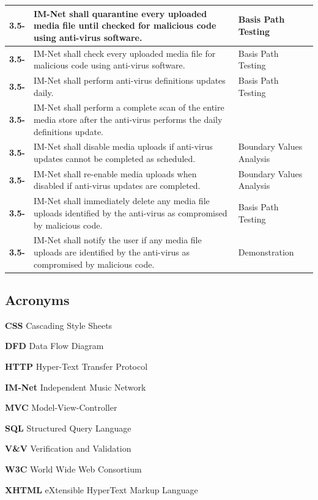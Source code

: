 \documentclass[letterpaper,12pt]{article}
\newcounter{rcounter}							%
\newcommand\rnumber{\stepcounter{rcounter}\arabic{rcounter}}
\newcommand{\Section}[1]{\section{#1} \setcounter{figure}{0}}
\begin{document}
{\begin{center}
\begin{tabular}{|l|p{4in}|p{2in}|}
\hline
\textbf{3.5-\rnumber} & IM-Net shall quarantine every uploaded media file until checked for malicious code using anti-virus software. & Basis Path Testing \\ 
\hline
\textbf{3.5-\rnumber} & IM-Net shall check every uploaded media file for malicious code using anti-virus software. & Basis Path Testing \\ 
\hline
\textbf{3.5-\rnumber} & IM-Net shall perform anti-virus definitions updates daily. & Basis Path Testing \\ 
\hline
\textbf{3.5-\rnumber} & IM-Net shall perform a complete scan of the entire media store after the anti-virus performs the daily definitions update. & \\ 
\hline
\textbf{3.5-\rnumber} & IM-Net shall disable media uploads if anti-virus updates cannot be completed as scheduled. & Boundary Values Analysis \\ 
\hline 
\textbf{3.5-\rnumber} & IM-Net shall re-enable media uploads when disabled if anti-virus updates are completed. & Boundary Values Analysis \\ 
\hline
\textbf{3.5-\rnumber} & IM-Net shall immediately delete any media file uploads identified by the anti-virus as compromised by malicious code. & Basis Path Testing \\ 
\hline
\textbf{3.5-\rnumber} & IM-Net shall notify the user if any media file uploads are identified by the anti-virus as compromised by malicious code. & Demonstration \\ 
\hline
\end{tabular} 
\end{center}

\eject 

\appendix

\textcolor{section}{\Section{Acronyms}}

\textbf{CSS} Cascading Style Sheets

\textbf{DFD} Data Flow Diagram

\textbf{HTTP} Hyper-Text Transfer Protocol

\textbf{IM-Net} Independent Music Network

\textbf{MVC} Model-View-Controller

\textbf{SQL} Structured Query Language

\textbf{V\&V} Verification and Validation

\textbf{W3C} World Wide Web Consortium

\textbf{XHTML} eXtensible HyperText Markup Language

}
\end{document}
